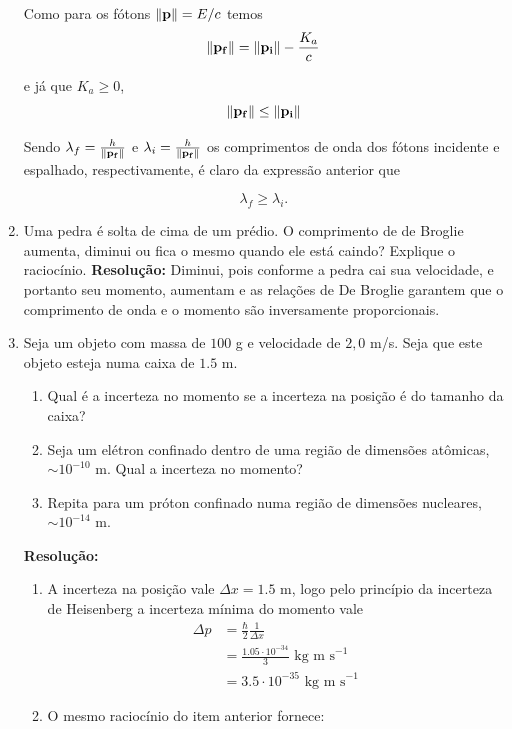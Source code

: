 \documentclass[a4paper, 12pt, notitlepage]{article}
\begin{document}
\begin{enumerate}
Como para os fótons $\norm{\vb{p}} = E/c$ temos
\begin{equation*}
\norm{\vb{p_f}} = \norm{\vb{p_i}} - \frac{K_a}{c}
\end{equation*}

\noindent e já que $K_a \ge 0$,
\begin{equation*}
\norm{\vb{p_f}} \le \norm{\vb{p_i}}
\end{equation*}

Sendo $\lambda_f = \frac{h}{\norm{\vb{p_f}}}$ e $\lambda_i = \frac{h}{\norm{\vb{p_f}}}$ os comprimentos de onda dos fótons incidente e espalhado, respectivamente, é claro da expressão anterior que

\begin{equation*}
\lambda_f \ge \lambda_i.
\end{equation*}

\item Uma pedra é solta de cima de um prédio. O comprimento de de Broglie aumenta, diminui ou fica o mesmo quando ele está caindo? Explique o raciocínio.\linebreak
\textbf{Resolução: }\linebreak
Diminui, pois conforme a pedra cai sua velocidade, e portanto seu momento, aumentam e as relações de De Broglie garantem que o comprimento de onda e o momento são inversamente proporcionais.

\item Seja um objeto com massa de $100$ g e velocidade de $2,0$ m/s. Seja que este objeto esteja numa caixa de $1.5$ m.
\begin{enumerate}
  \item Qual é a incerteza no momento se a incerteza na posição é do tamanho da caixa?
  \item Seja um elétron confinado dentro de uma região de dimensões atômicas, $\sim 10^{-10}$ m. Qual a incerteza no momento?
  \item Repita para um próton confinado numa região de dimensões nucleares, $\sim 10^{-14}$ m.
\end{enumerate}
\textbf{Resolução: }\linebreak
\begin{enumerate}
  \item A incerteza na posição vale $\Delta x = 1.5$ m, logo pelo princípio da incerteza de Heisenberg a incerteza mínima do momento vale
  \begin{align*}
  \Delta p &= \frac{\hbar}{2} \frac{1}{\Delta x} \\
  &= \frac{1.05 \cdot 10^{-34}}{3} \text{ kg m s}^{-1} \\
  &= 3.5 \cdot 10^{-35} \text{ kg m s}^{-1}
  \end{align*}
  \item O mesmo raciocínio do item anterior fornece:


\end{enumerate}
\end{enumerate}
\end{document}
